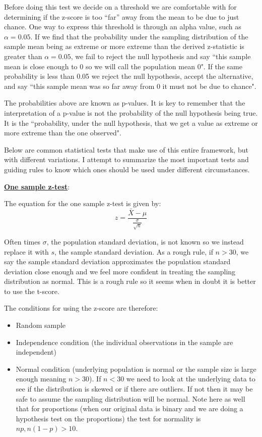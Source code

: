 Before doing this test we decide on a threshold we are comfortable with for determining if the z-score is too ``far'' away from the mean to be due to just chance. One way to express this threshold is through an alpha value, such as $\alpha=0.05$. If we find that the probability under the sampling distribution of the sample mean being as extreme or more extreme than the derived z-statistic is greater than $\alpha=0.05$, we fail to reject the null hypothesis and say ``this sample mean is close enough to 0 so we will call the population mean 0". If the same probability is less than 0.05 we reject the null hypothesis, accept the alternative, and say ``this sample mean was so far away from 0 it must not be due to chance". 

The probabilities above are known as p-values. It is key to remember that the interpretation of a p-value is not the probability of the null hypothesis being true. It is the ``probability, under the null hypothesis, that we get a value as extreme or more extreme than the one observed".

Below are common statistical tests that make use of this entire framework, but with different variations. I attempt to summarize the most important tests and guiding rules to know which ones should be used under different circumstances.
\newline

\noindent \underline{\textbf{One sample z-test}}:

The equation for the one sample z-test is given by:
\begin{equation}
z = \frac{\bar{X} - \mu}{\frac{\sigma}{\sqrt{n}}}
\end{equation}

Often times $\sigma$, the population standard deviation, is not known so we instead replace it with $s$, the sample standard deviation. As a rough rule, if $n>30$, we say the sample standard deviation approximates the population standard deviation close enough and we feel more confident in treating the sampling distribution as normal. This is a rough rule so it seems when in doubt it is better to use the t-score. 

The conditions for using the z-score are therefore:
\begin{itemize}
\item Random sample
\item Independence condition (the individual observations in the sample are independent)
\item Normal condition (underlying population is normal or the sample size is large enough meaning $n>30$). If $n<30$ we need to look at the underlying data to see if the distribution is skewed or if there are outliers. If not then it may be safe to assume the sampling distribution will be normal. Note here as well that for proportions (when our original data is binary and we are doing a hypothesis test on the proportions) the test for normality is $np, n(1-p) > 10$.
\end{itemize}


